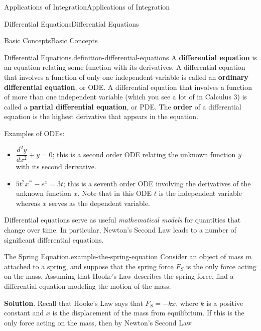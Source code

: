 \documentclass[10pt,]{book}
\newcommand{\terminology}[1]{\textbf{#1}}
\numberwithin{equation}{section}
\newcommand{\dv}[3][]{\dfrac{d^{#1} #2}{d #3^{#1}}}
\begin{document}
\begin{chapterptx}{Applications of Integration}{}{Applications of Integration}{}{}
\begin{sectionptx}{Differential Equations}{}{Differential Equations}{}{}
%
%
\typeout{************************************************}
\typeout{************************************************}
%
\begin{subsectionptx}{Basic Concepts}{}{Basic Concepts}{}{}\label{subsection-basic-concepts}
\begin{definition}{Differential Equations.}{definition-differential-equations}%
\hypertarget{p-715}{}%
A \terminology{differential equation} is an equation relating some function with its derivatives. A differential equation that involves a function of only one independent variable is called an \terminology{ordinary differential equation}, or ODE. A differential equation that involves a function of more than one independent variable (which you see a lot of in Calculus 3) is called a \terminology{partial differential equation}, or PDE. The \terminology{order} of a differential equation is the highest derivative that appears in the equation.%
\end{definition}
\hypertarget{p-716}{}%
Examples of ODEs: \leavevmode%
\begin{itemize}[label=\textbullet]
\item{}\hypertarget{p-717}{}%
\(\dv[2]{y}{x} + y = 0\); this is a second order ODE relating the unknown function \(y\) with its second derivative.%
\item{}\hypertarget{p-718}{}%
\(5t^{2}x^{'''} - e^{x} = 3t\); this is a seventh order ODE involving the derivatives of the unknown function \(x\). Note that in this ODE \(t\) is the independent variable whereas \(x\) serves as the dependent variable.%
\end{itemize}
%
\par
\hypertarget{p-719}{}%
Differential equations serve as useful \emph{mathematical models} for quantities that change over time. In particular, Newton's Second Law leads to a number of significant differential equations.%
\begin{example}{The Spring Equation.}{example-the-spring-equation}%
\hypertarget{p-720}{}%
Consider an object of mass \(m\) attached to a spring, and suppose that the spring force \(F_{S}\) is the only force acting on the mass. Assuming that Hooke's Law describes the spring force, find a differential equation modeling the motion of the mass.%
\par\smallskip%
\noindent\textbf{Solution}.\hypertarget{solution-152}{}\quad%
\hypertarget{p-721}{}%
Recall that Hooke's Law says that \(F_{S} = -kx\), where \(k\) is a positive constant and \(x\) is the displacement of the mass from equilibrium. If this is the only force acting on the mass, then by Newton's Second Law%

\end{example}
\end{subsectionptx}
\end{sectionptx}
\end{chapterptx}
\end{document}

